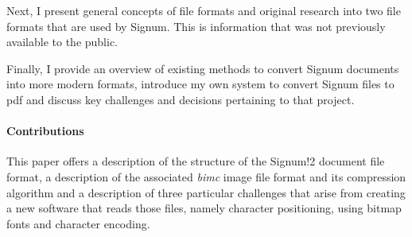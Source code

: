 Next, I present general concepts of file formats and original research into two file formats that are used by Signum. This is information that was not previously available to the public.

Finally, I provide an overview of existing methods to convert Signum documents into more modern formats, introduce my own system to convert Signum files to \acrshort{pdf} and discuss key challenges and decisions pertaining to that project.





\paragraph{Contributions} This paper offers a description of the structure of the Signum!2 document file format, a description of the associated \textit{bimc} image file format and its compression algorithm and a description of three particular challenges that arise from creating a new software that reads those files, namely character positioning, using bitmap fonts and character encoding.